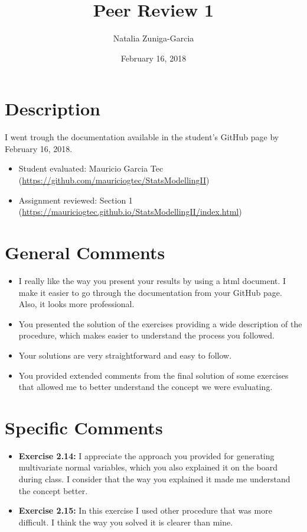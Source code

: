 \documentclass[11 pt]{article}
\author{Natalia Zuniga-Garcia}
\title{Peer Review 1}
\date{February 16, 2018}
\begin{document}
\maketitle

\section{Description}

I went trough the documentation available in the student's GitHub page by February 16, 2018.

\begin{itemize}
	\item Student evaluated:  Mauricio Garcia Tec (\url{https://github.com/mauriciogtec/StatsModellingII})
	\item Assignment reviewed: Section 1 (\url{https://mauriciogtec.github.io/StatsModellingII/index.html})

\end{itemize}
	


\section{General Comments}
\begin{itemize}
	\item I really like the way you present your results by using a html document. I make it easier to go through the documentation from your GitHub page. Also, it looks more professional.
	\item You presented the solution of the exercises providing a wide description of the procedure, which makes easier to understand the process you followed.
	\item Your solutions are very straightforward and easy to follow.
	\item You provided extended comments from the final solution of some exercises that allowed me to better understand the concept we were evaluating.

	
\end{itemize}

\section{Specific Comments}
\begin{itemize}
		\item \textbf{Exercise 2.14:} I appreciate the approach you provided for generating multivariate normal variables, which you also explained it on the board during class. I consider that the way you explained it made me  understand the concept better.
		\item \textbf{Exercise 2.15:} In this exercise I used other procedure that was more difficult.  I think the way you solved it is clearer than mine.

\end{itemize}
\end{document}
